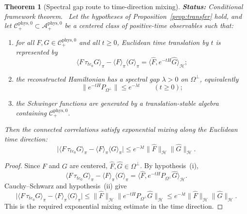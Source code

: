 \documentclass[12pt,a4paper]{article}
\theoremstyle{plain}
\newtheorem{theorem}{Theorem}[section]
\theoremstyle{definition}
\theoremstyle{remark}
\newcommand{\hilb}{\mathcal{H}}
\newcommand{\alg}{\mathcal{A}}
\newcommand{\status}[1]{\textnormal{\textbf{Status:} #1.}\ }
\begin{document}
\begin{theorem}[Spectral gap route to time-direction mixing]\label{thm:gap-to-mixing}
  \status{Conditional framework theorem}
  Let the hypotheses of Proposition~\ref{prop:transfer} hold, and let
  $\mathcal{C}^{\mathrm{phys},0}_+ \subset \alg^{\mathrm{phys},0}_+$
  be a centered class of positive-time observables such that:
  \begin{enumerate}[nosep,label=(\roman*)]
  \item for all $F,G \in \mathcal{C}^{\mathrm{phys},0}_+$ and all
    $t \ge 0$, Euclidean time translation by $t$ is represented by
    \[
      \langle F\,\tau_{t e_0} G\rangle_\pi
      - \langle F\rangle_\pi \langle G\rangle_\pi
      = \langle \widehat{F}, e^{-tH}\widehat{G}\rangle_\hilb;
    \]
  \item the reconstructed Hamiltonian has a spectral gap $\lambda>0$
    on $\Omega^\perp$, equivalently
    \[
      \|e^{-tH}P_{\Omega^\perp}\|
      \le e^{-\lambda t}
      \qquad (t \ge 0);
    \]
  \item the Schwinger functions are generated by a translation-stable
    algebra containing $\mathcal{C}^{\mathrm{phys},0}_+$.
  \end{enumerate}
  Then the connected correlations satisfy exponential mixing along the
  Euclidean time direction:
  \[
    \big|\langle F\,\tau_{t e_0}G\rangle_\pi
    - \langle F\rangle_\pi \langle G\rangle_\pi\big|
    \le e^{-\lambda t}\|\widehat{F}\|_\hilb \|\widehat{G}\|_\hilb.
  \]
\end{theorem}
\begin{proof}
  Since $F$ and $G$ are centered, $\widehat{F},\widehat{G}\in
  \Omega^\perp$. By hypothesis~(i),
  \[
    \langle F\,\tau_{t e_0} G\rangle_\pi
    - \langle F\rangle_\pi \langle G\rangle_\pi
    = \langle \widehat{F}, e^{-tH}P_{\Omega^\perp}\widehat{G}\rangle_\hilb.
  \]
  Cauchy--Schwarz and hypothesis~(ii) give
  \[
    \big|\langle F\,\tau_{t e_0}G\rangle_\pi
    - \langle F\rangle_\pi \langle G\rangle_\pi\big|
    \le \|\widehat{F}\|_\hilb
    \|e^{-tH}P_{\Omega^\perp}\widehat{G}\|_\hilb
    \le e^{-\lambda t}\|\widehat{F}\|_\hilb \|\widehat{G}\|_\hilb.
  \]
  This is the required exponential mixing estimate in the time
  direction.
\end{proof}
\end{document}
